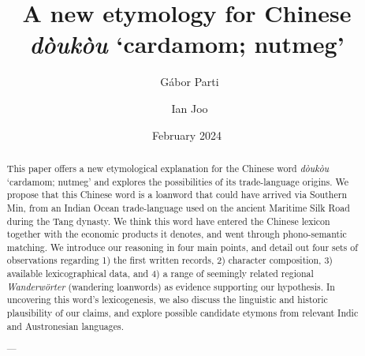 \documentclass[12pt]{article}
\title{A new etymology for Chinese \tc{豆蔻} \textit{dòukòu} `cardamom; nutmeg' }
\author[1]{{\small\orcid{0000-0003-2042-4655}}~Gábor Parti}
\author[2]{{\small\orcid{}}~Ian Joo}
\affil[1,2]{The Hong Kong Polytechnic University}
\affil[2]{Nagoya University of Commerce and Business}
\date{\small{February 2024}}
\newcommand{\tc}[1]{\traditionalchinesefont{#1}\rmfamily}
\begin{document}
\maketitle

\begin{abstract}
    This paper offers a new etymological explanation for the Chinese word \tc{豆蔻} \textit{dòukòu} `cardamom; nutmeg' and explores the possibilities of its trade-language origins. We propose that this Chinese word is a loanword that could have arrived via Southern Min, from an Indian Ocean trade-language used on the ancient Maritime Silk Road during the Tang dynasty. We think this word have entered the Chinese lexicon together with the economic products it denotes, and went through phono-semantic matching. We introduce our reasoning in four main points, and detail out four sets of observations regarding 1) the first written records, 2) character composition, 3) available lexicographical data, and 4) a range of seemingly related regional \textit{Wanderwörter} (wandering loanwords) as evidence supporting our hypothesis. In uncovering this word's lexicogenesis, we also discuss the linguistic and historic plausibility of our claims, and  explore possible candidate etymons from relevant Indic and Austronesian languages.

    ---


\end{abstract}
\end{document}
